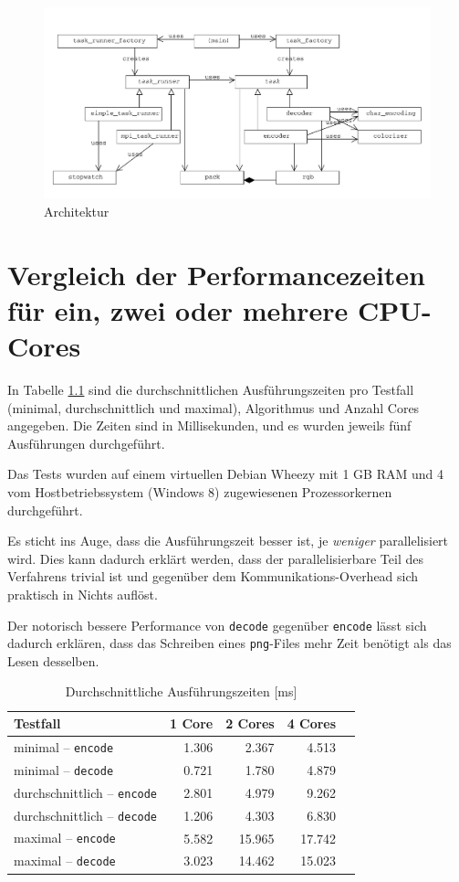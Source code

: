 \documentclass[11pt]{scrreprt} %
\theoremstyle{definition}
\begin{document}
\begin{figure}
\caption{Architektur}
\label{fig:arch}
\begin{center}
\includegraphics[scale=0.5]{biltli/arch.pdf}
\end{center}
\end{figure}

\chapter{Vergleich der Performancezeiten für ein, zwei oder mehrere CPU-Cores}

In Tabelle \ref{tab:perf} sind die durchschnittlichen Ausführungszeiten pro Testfall (minimal, durchschnittlich und maximal), Algorithmus und Anzahl Cores angegeben. Die Zeiten sind in Millisekunden, und es wurden jeweils fünf Ausführungen durchgeführt.

Das Tests wurden auf einem virtuellen Debian Wheezy mit 1 GB RAM und 4 vom Hostbetriebssystem (Windows 8) zugewiesenen Prozessorkernen durchgeführt.

Es sticht ins Auge, dass die Ausführungszeit besser ist, je {\it weniger} parallelisiert wird. Dies kann dadurch erklärt werden, dass der parallelisierbare Teil des Verfahrens trivial ist und gegenüber dem Kommunikations-Overhead sich praktisch in Nichts auflöst.

Der notorisch bessere Performance von {\tt decode} gegenüber {\tt encode} lässt sich dadurch erklären, dass das Schreiben eines {\tt png}-Files mehr Zeit benötigt als das Lesen desselben.

\begin{table}
\caption{Durchschnittliche Ausführungszeiten [ms]}
\label{tab:perf}
\begin{center}
\begin{tabular}{lrrrr}
\toprule
Testfall & 1 Core & 2 Cores & 4 Cores\\
\midrule
minimal -- {\tt encode} & 1.306 & 2.367 & 4.513  \\
minimal -- {\tt decode} & 0.721 & 1.780 & 4.879  \\
durchschnittlich -- {\tt encode} & 2.801 & 4.979 & 9.262 \\
durchschnittlich -- {\tt decode} & 1.206 & 4.303 & 6.830\\
maximal -- {\tt encode} & 5.582 & 15.965 & 17.742  \\
maximal -- {\tt decode} & 3.023 & 14.462 & 15.023 \\
\bottomrule
\end{tabular}
\end{center}
\end{table}
\end{document}
